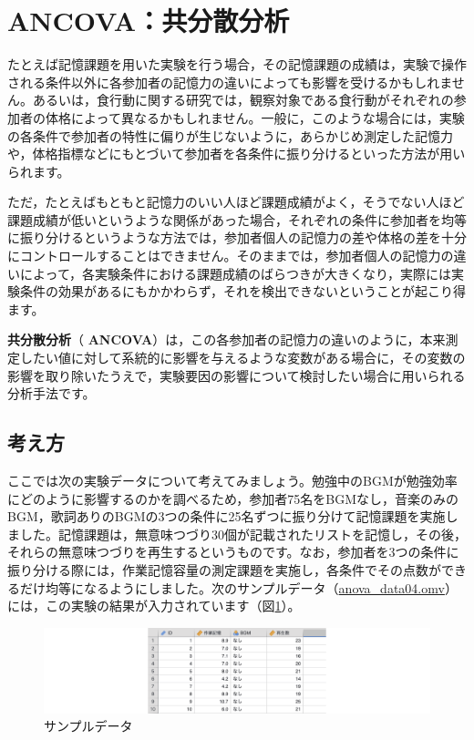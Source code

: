 \documentclass[
  12pt,
  a5jpaper,
  lualatex, ja=standard]{bxjsbook}
\renewcommand{\emph}[1]{\textbf{\color{emph} #1}}
\begin{document}
\hypertarget{sec:ANOVA-ancova}{%
\section{ANCOVA：共分散分析}\label{sec:ANOVA-ancova}}

たとえば記憶課題を用いた実験を行う場合，その記憶課題の成績は，実験で操作される条件以外に各参加者の記憶力の違いによっても影響を受けるかもしれません。あるいは，食行動に関する研究では，観察対象である食行動がそれぞれの参加者の体格によって異なるかもしれません。一般に，このような場合には，実験の各条件で参加者の特性に偏りが生じないように，あらかじめ測定した記憶力や，体格指標などにもとづいて参加者を各条件に振り分けるといった方法が用いられます。

ただ，たとえばもともと記憶力のいい人ほど課題成績がよく，そうでない人ほど課題成績が低いというような関係があった場合，それぞれの条件に参加者を均等に振り分けるというような方法では，参加者個人の記憶力の差や体格の差を十分にコントロールすることはできません。そのままでは，参加者個人の記憶力の違いによって，各実験条件における課題成績のばらつきが大きくなり，実際には実験条件の効果があるにもかかわらず，それを検出できないということが起こり得ます。

\emph{共分散分析}（\emph{ANCOVA}）は，この各参加者の記憶力の違いのように，本来測定したい値に対して系統的に影響を与えるような変数がある場合に，その変数の影響を取り除いたうえで，実験要因の影響について検討したい場合に用いられる分析手法です。

\hypertarget{sub:ANOVA-ancova-basics}{%
\subsection{考え方}\label{sub:ANOVA-ancova-basics}}

ここでは次の実験データについて考えてみましょう。勉強中のBGMが勉強効率にどのように影響するのかを調べるため，参加者75名をBGMなし，音楽のみのBGM，歌詞ありのBGMの3つの条件に25名ずつに振り分けて記憶課題を実施しました。記憶課題は，無意味つづり30個が記載されたリストを記憶し，その後，それらの無意味つづりを再生するというものです。なお，参加者を3つの条件に振り分ける際には，作業記憶容量の測定課題を実施し，各条件でその点数ができるだけ均等になるようにしました。次のサンプルデータ（\href{https://github.com/sbtseiji/jmv_compguide/raw/main/data/omv/anova_data04.omv}{anova\_data04.omv}）には，この実験の結果が入力されています（図\ref{fig:ANOVA-data04}）。

\begin{figure}[!ht]

{\centering \includegraphics[width=1\linewidth]{images/ANOVA/data04} 

}

\caption{サンプルデータ}\label{fig:ANOVA-data04}
\end{figure}
\end{document}
